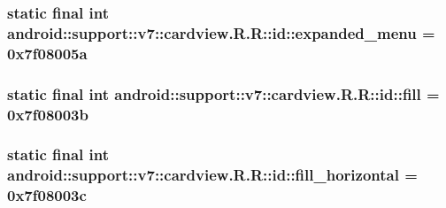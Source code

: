 \hypertarget{classandroid_1_1support_1_1v7_1_1cardview_1_1_r_1_1id_ed22a72950f6477b1f3997c028df7909}{
\subsubsection[{expanded\_\-menu}]{\setlength{\rightskip}{0pt plus 5cm}static final int android::support::v7::cardview.R.R::id::expanded\_\-menu = 0x7f08005a}}
\label{classandroid_1_1support_1_1v7_1_1cardview_1_1_r_1_1id_ed22a72950f6477b1f3997c028df7909}


\hypertarget{classandroid_1_1support_1_1v7_1_1cardview_1_1_r_1_1id_43d8e02a90cd3a0ce5e0a0413f1ed06e}{
\subsubsection[{fill}]{\setlength{\rightskip}{0pt plus 5cm}static final int android::support::v7::cardview.R.R::id::fill = 0x7f08003b}}
\label{classandroid_1_1support_1_1v7_1_1cardview_1_1_r_1_1id_43d8e02a90cd3a0ce5e0a0413f1ed06e}


\hypertarget{classandroid_1_1support_1_1v7_1_1cardview_1_1_r_1_1id_42e33de9deb8ba5609ec44906c1a3088}{
\subsubsection[{fill\_\-horizontal}]{\setlength{\rightskip}{0pt plus 5cm}static final int android::support::v7::cardview.R.R::id::fill\_\-horizontal = 0x7f08003c}}
\label{classandroid_1_1support_1_1v7_1_1cardview_1_1_r_1_1id_42e33de9deb8ba5609ec44906c1a3088}



